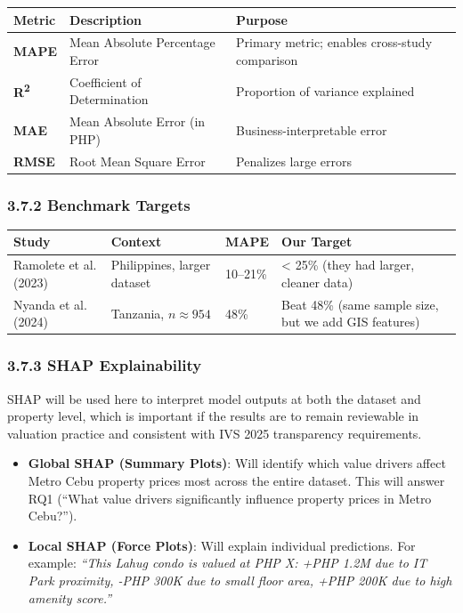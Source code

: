 \begin{center}
\begin{tabular}{p{} p{} p{}}
\toprule
Metric & Description & Purpose \\
\midrule
\textbf{MAPE} & Mean Absolute Percentage Error & Primary metric; enables cross-study comparison \\
\textbf{R\textsuperscript{2}} & Coefficient of Determination & Proportion of variance explained \\
\textbf{MAE} & Mean Absolute Error (in PHP) & Business-interpretable error \\
\textbf{RMSE} & Root Mean Square Error & Penalizes large errors \\
\bottomrule
\end{tabular}
\end{center}

\subsubsection{\texorpdfstring{\textbf{3.7.2 Benchmark Targets}}{3.7.2 Benchmark Targets}}\label{benchmark-targets}

\begin{center}
\begin{tabular}{p{} p{} p{} p{}}
\toprule
Study & Context & MAPE & Our Target \\
\midrule
Ramolete et al. (2023) & Philippines, larger dataset & 10--21\% & \textless{} 25\% (they had larger, cleaner data) \\
Nyanda et al. (2024) & Tanzania, $n \approx 954$ & 48\% & Beat 48\% (same sample size, but we add GIS features) \\
\bottomrule
\end{tabular}
\end{center}

\subsubsection{\texorpdfstring{\textbf{3.7.3 SHAP Explainability}}{3.7.3 SHAP Explainability}}\label{shap-explainability}

SHAP will be used here to interpret model outputs at both the dataset and property level, which is important if the results are to remain reviewable in valuation practice and consistent with IVS 2025 transparency requirements.

\begin{itemize}
\item \textbf{Global SHAP (Summary Plots)}: Will identify which value drivers affect Metro Cebu property prices most across the entire dataset. This will answer RQ1 (``What value drivers significantly influence property prices in Metro Cebu?'').
\item \textbf{Local SHAP (Force Plots)}: Will explain individual predictions. For example: \emph{``This Lahug condo is valued at PHP X: +PHP 1.2M due to IT Park proximity, -PHP 300K due to small floor area, +PHP 200K due to high amenity score.''}
\end{itemize}

